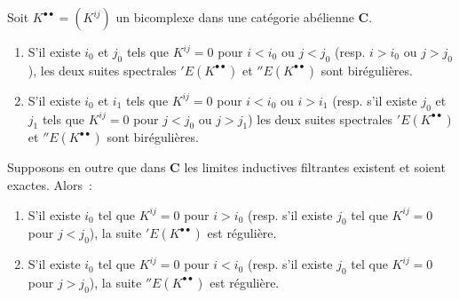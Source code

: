 \begin{proposition}[11.3.3]
\label{0.11.3.3-fr}
Soit $K^{\bullet\bullet}=(K^{ij})$ un bicomplexe dans une catégorie abélienne
$\boldsymbol{C}$.
\begin{enumerate}
  \item[\textup{(i)}] S'il existe $i_0$ et $j_0$ tels que $K^{ij}=0$ pour $i<i_0$ ou
    $j<j_0$ \textup{(resp.} $i>i_0$ ou $j>j_0$), les deux suites spectrales
    $'E(K^{\bullet\bullet})$ et $''E(K^{\bullet\bullet})$ sont
    birégulières.
  \item[\textup{(ii)}] S'il existe $i_0$ et $i_1$ tels que $K^{ij}=0$ pour $i<i_0$ ou
    $i>i_1$ \textup{(resp.} s'il existe $j_0$ et $j_1$ tels que $K^{ij}=0$ pour
    $j<j_0$ ou $j>j_1$) les deux suites spectrales
    $'E(K^{\bullet\bullet})$ et $''E(K^{\bullet\bullet})$ sont
    birégulières.
\end{enumerate}
Supposons en outre que dans $\boldsymbol{C}$ les limites inductives filtrantes
existent et soient exactes. Alors~:
\begin{enumerate}
  \item[\textup{(iii)}] S'il existe $i_0$ tel que $K^{ij}=0$ pour $i>i_0$ \textup{(resp.} s'il
    existe $j_0$ tel que $K^{ij}=0$ pour $j<j_0$), la suite
    $'E(K^{\bullet\bullet})$ est régulière.
  \item[\textup{(iv)}] S'il existe $i_0$ tel que $K^{ij}=0$ pour $i<i_0$ \textup{(resp.} s'il
    existe $j_0$ tel que $K^{ij}=0$ pour $j>j_0$), la suite
    $''E(K^{\bullet\bullet})$ est régulière.
\end{enumerate}
\end{proposition}

